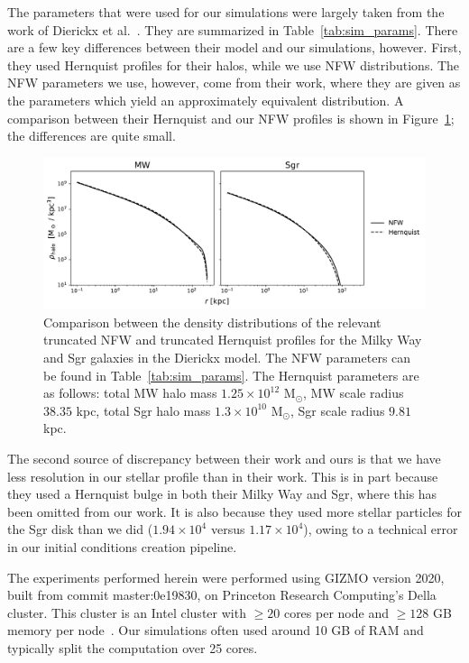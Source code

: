 The parameters that were used for our simulations were largely taken from the
work of Dierickx et al.~\cite{dierickx_predicted_2017}. They are summarized in
Table~\ref{tab:sim_params}. There are a few key differences between their model
and our simulations, however. First, they used Hernquist profiles for their
halos, while we use NFW distributions. The NFW parameters we use, however, come
from their work, where they are given as the parameters which yield an
approximately equivalent distribution. A comparison between their Hernquist
and our NFW profiles is shown in Figure~\ref{fig:nfw_vs_hernquist}; the
differences are quite small.

\begin{figure}
    \centering
    \includegraphics[width=0.9\linewidth]{figs/nfw_vs_hernquist.pdf}
    \caption{%
        Comparison between the density distributions of the relevant truncated
        NFW and truncated Hernquist profiles for the Milky Way and Sgr
        galaxies in the Dierickx model.  The NFW parameters can be found in
        Table~\ref{tab:sim_params}.  The Hernquist parameters are as follows:
        total MW halo mass $1.25 \times 10^{12}$ M$_\odot$, MW scale radius
        $38.35$ kpc, total Sgr halo mass $1.3 \times 10^{10}$ M$_\odot$, Sgr
        scale radius $9.81$ kpc.
    }
    \label{fig:nfw_vs_hernquist}
\end{figure}

The second source of discrepancy between their work and ours is that we have
less resolution in our stellar profile than in their work. This is in part
because they used a Hernquist bulge in both their Milky Way and Sgr, where this
has been omitted from our work. It is also because they used more stellar
particles for the Sgr disk than we did ($1.94 \times 10^4$ versus $1.17 \times
10^4$), owing to a technical error in our initial conditions creation
pipeline.

The experiments performed herein were performed using GIZMO version
2020, built from commit master:0e19830, on Princeton Research Computing's
Della cluster.  This cluster is an Intel cluster with $\geq 20$ cores per node
and $\geq 128$ GB memory per
node~\cite{princeton_research_computing_della_nodate}.  Our simulations often
used around 10 GB of RAM and typically split the computation over 25 cores.

